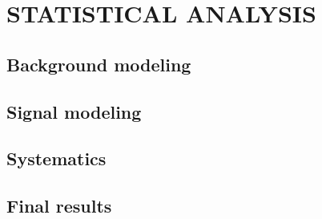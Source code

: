 \chapter{STATISTICAL ANALYSIS}
\section{Background modeling}
\section{Signal modeling}
\section{Systematics}
\section{Final results}
